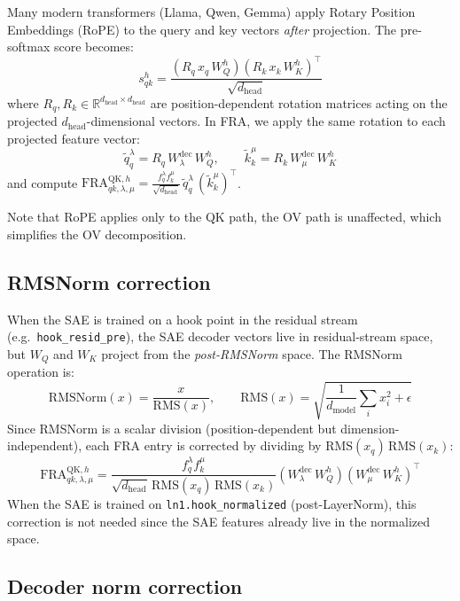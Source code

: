 \documentclass{article}
\theoremstyle{plain}
\theoremstyle{definition}
\theoremstyle{remark}
\newcommand{\Wdec}{W^{\mathrm{dec}}}
\newcommand{\WQ}{W_Q}
\newcommand{\WK}{W_K}
\newcommand{\dmodel}{d_{\mathrm{model}}}
\newcommand{\dhead}{d_{\mathrm{head}}}
\newcommand{\RR}{\mathbb{R}}
\begin{document}
Many modern transformers (Llama, Qwen, Gemma) apply Rotary Position Embeddings (RoPE) to the query and key vectors \emph{after} projection. The pre-softmax score becomes:
\begin{equation}
    s^h_{qk} = \frac{\left(R_q\, x_q\,\WQ^h \right) \left( R_k\, x_k\,\WK^h \right)^\top}{\sqrt{\dhead}}
\end{equation}
where $R_q, R_k \in \RR^{\dhead \times \dhead}$ are position-dependent rotation matrices acting on the projected $\dhead$-dimensional vectors. In FRA, we apply the same rotation to each projected feature vector:
\begin{equation}
    \tilde{q}_q^\lambda = R_q\, \Wdec_\lambda\,\WQ^h, \qquad \tilde{k}_k^\mu = R_k\, \Wdec_\mu\,\WK^h
\end{equation}
and compute $\mathrm{FRA}^{\mathrm{QK},h}_{qk,\lambda,\mu} = \frac{f_q^\lambda f_k^\mu}{\sqrt{\dhead}}\, \tilde{q}_q^\lambda \, (\tilde{k}_k^\mu)^\top$.

Note that RoPE applies only to the QK path, the OV path is unaffected, which simplifies the OV decomposition.

\subsection{RMSNorm correction}
\label{app:rms}

When the SAE is trained on a hook point in the residual stream (e.g.\ \texttt{hook\_resid\_pre}), the SAE decoder vectors live in residual-stream space, but $\WQ$ and $\WK$ project from the \emph{post-RMSNorm} space. The RMSNorm operation is:
\begin{equation}
    \mathrm{RMSNorm}(x) = \frac{x}{\mathrm{RMS}(x)}, \qquad \mathrm{RMS}(x) = \sqrt{\frac{1}{\dmodel} \sum_i x_i^2 + \epsilon}
\end{equation}
Since RMSNorm is a scalar division (position-dependent but dimension-independent), each FRA entry is corrected by dividing by $\mathrm{RMS}(x_q)\,\mathrm{RMS}(x_k)$:
\begin{equation}
    \mathrm{FRA}^{\mathrm{QK},h}_{qk,\lambda,\mu} = \frac{f_q^\lambda f_k^\mu}{\sqrt{\dhead}\,\mathrm{RMS}(x_q)\,\mathrm{RMS}(x_k)} \left( \Wdec_\lambda\,\WQ^h \right) \left( \Wdec_\mu\,\WK^h \right)^\top
\end{equation}
When the SAE is trained on \texttt{ln1.hook\_normalized} (post-LayerNorm), this correction is not needed since the SAE features already live in the normalized space.

\subsection{Decoder norm correction}
\label{app:dec_norm}
\end{document}
